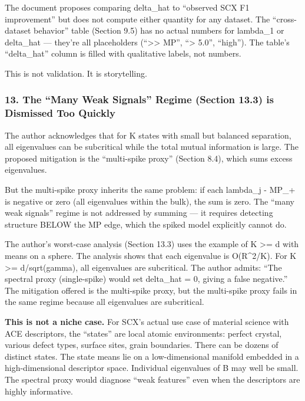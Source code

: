 \documentclass[
  12pt,
]{article}
\begin{document}
The document proposes comparing delta\_hat to ``observed SCX F1
improvement'' but does not compute either quantity for any dataset. The
``cross-dataset behavior'' table (Section 9.5) has no actual numbers for
lambda\_1 or delta\_hat --- they're all placeholders
(``\textgreater\textgreater{} MP'', ``\textgreater{} 5.0'', ``high'').
The table's ``delta\_hat'' column is filled with qualitative labels, not
numbers.

This is not validation. It is storytelling.

\subsubsection{13. The ``Many Weak Signals'' Regime (Section 13.3) is
Dismissed Too
Quickly}\label{the-many-weak-signals-regime-section-13.3-is-dismissed-too-quickly}

The author acknowledges that for K states with small but balanced
separation, all eigenvalues can be subcritical while the total mutual
information is large. The proposed mitigation is the ``multi-spike
proxy'' (Section 8.4), which sums excess eigenvalues.

But the multi-spike proxy inherits the same problem: if each lambda\_j -
MP\_+ is negative or zero (all eigenvalues within the bulk), the sum is
zero. The ``many weak signals'' regime is not addressed by summing ---
it requires detecting structure BELOW the MP edge, which the spiked
model explicitly cannot do.

The author's worst-case analysis (Section 13.3) uses the example of K
\textgreater= d with means on a sphere. The analysis shows that each
eigenvalue is O(R\^{}2/K). For K \textgreater= d/sqrt(gamma), all
eigenvalues are subcritical. The author admits: ``The spectral proxy
(single-spike) would set delta\_hat = 0, giving a false negative.'' The
mitigation offered is the multi-spike proxy, but the multi-spike proxy
fails in the same regime because all eigenvalues are subcritical.

\textbf{This is not a niche case.} For SCX's actual use case of material
science with ACE descriptors, the ``states'' are local atomic
environments: perfect crystal, various defect types, surface sites,
grain boundaries. There can be dozens of distinct states. The state
means lie on a low-dimensional manifold embedded in a high-dimensional
descriptor space. Individual eigenvalues of B may well be small. The
spectral proxy would diagnose ``weak features'' even when the
descriptors are highly informative.
\end{document}
